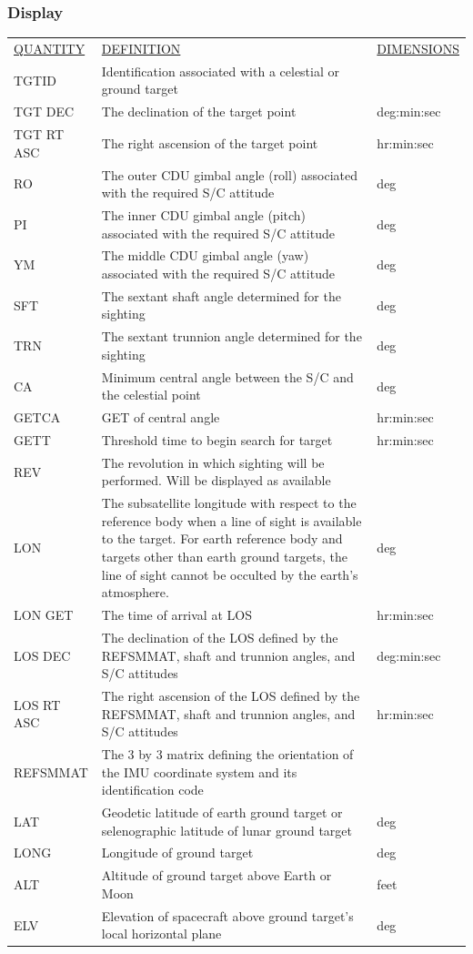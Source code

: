 \documentclass[11pt]{article} %
\begin{document}
\subsubsection{Display}
\begin{center}
\begin{tabular}{ L{2.4cm} L{7.1cm} L{3cm} }
\underline{QUANTITY} & \underline{DEFINITION} & \underline{DIMENSIONS} \\
TGTID&Identification associated with a celestial or ground target&\\
TGT DEC&The declination of the target point&deg:min:sec\\
TGT RT ASC&The right ascension of the target point&hr:min:sec\\
RO&The outer CDU gimbal angle (roll) associated with the required S/C attitude&deg\\
PI&The inner CDU gimbal angle (pitch) associated with the required S/C attitude&deg\\
YM&The middle CDU gimbal angle (yaw) associated with the required S/C attitude&deg\\
SFT&The sextant shaft angle determined for the sighting&deg\\
TRN&The sextant trunnion angle determined for the sighting&deg\\
CA&Minimum central angle between the S/C and the celestial point&deg\\
GETCA&GET of central angle&hr:min:sec\\
GETT&Threshold time to begin search for target&hr:min:sec\\
REV&The revolution in which sighting will be performed. Will be displayed as available&\\
LON&The subsatellite longitude with respect to the reference body when a line of sight is available to the target. For earth reference body and targets other than earth ground targets, the line of sight cannot be occulted by the earth's atmosphere. &deg\\
LON GET&The time of arrival at LOS&hr:min:sec\\
LOS DEC&The declination of the LOS defined by the REFSMMAT, shaft and trunnion angles, and S/C attitudes&deg:min:sec\\
LOS RT ASC&The right ascension of the LOS defined by the REFSMMAT, shaft and trunnion angles, and S/C attitudes&hr:min:sec\\
REFSMMAT&The 3 by 3 matrix defining the orientation of the IMU coordinate system and its identification code&\\
LAT&Geodetic latitude of earth ground target or selenographic latitude of lunar ground target&deg\\
LONG&Longitude of ground target&deg\\
ALT&Altitude of ground target above Earth or Moon&feet\\
ELV&Elevation of spacecraft above ground target's local horizontal plane&deg\\
\end{tabular}
\end{center}
\newpage
\end{document}

